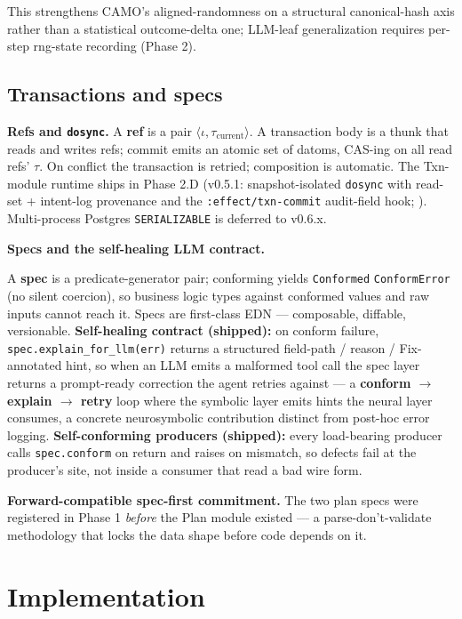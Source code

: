 \documentclass[anon]{nesy2026}   %
\newcommand{\C}[1]{\texttt{#1}}
\begin{document}
This strengthens CAMO's aligned-randomness on a structural canonical-hash axis rather than a statistical outcome-delta one; LLM-leaf generalization requires per-step rng-state recording (Phase 2).

\subsection{Transactions and specs}\label{sec:transactions}

\textbf{Refs and \C{dosync}.}\label{sec:transactions-refs} A \textbf{ref} is a pair $\langle \iota, \tau_{\text{current}} \rangle$. A transaction body is a thunk that reads and writes refs; commit emits an atomic set of datoms, CAS-ing on all read refs' $\tau$. On conflict the transaction is retried; composition is automatic. The Txn-module runtime ships in Phase 2.D (v0.5.1: snapshot-isolated \C{dosync} with read-set + intent-log provenance and the \C{:effect/txn-commit} audit-field hook; ). Multi-process Postgres \texttt{SERIALIZABLE} is deferred to v0.6.x.

\textbf{Specs and the self-healing LLM contract.}\label{sec:specs}

A \textbf{spec} is a predicate-generator pair; conforming yields \C{Conformed} \textbar{} \C{ConformError} (no silent coercion), so business logic types against conformed values and raw inputs cannot reach it. Specs are first-class EDN --- composable, diffable, versionable. \textbf{Self-healing contract (shipped):} on conform failure, \C{spec.explain\_for\_llm(err)} returns a structured field-path / reason / Fix-annotated hint, so when an LLM emits a malformed tool call the spec layer returns a prompt-ready correction the agent retries against --- a \textbf{conform $\to$ explain $\to$ retry} loop where the symbolic layer emits hints the neural layer consumes, a concrete neurosymbolic contribution distinct from post-hoc error logging. \textbf{Self-conforming producers (shipped):} every load-bearing producer calls \C{spec.conform} on return and raises on mismatch, so defects fail at the producer's site, not inside a consumer that read a bad wire form.

\textbf{Forward-compatible spec-first commitment.} The two plan specs were registered in Phase 1 \emph{before} the Plan module existed --- a parse-don't-validate methodology that locks the data shape before code depends on it.

\section{Implementation}\label{sec:impl}
\end{document}
